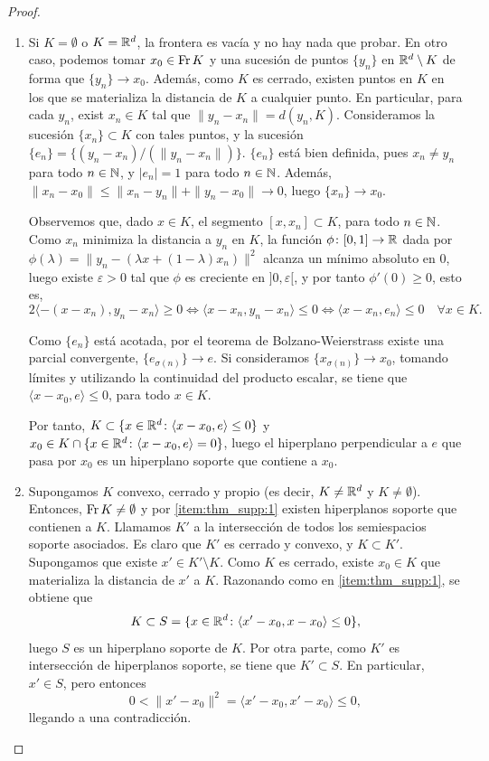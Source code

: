\begin{proof}~
    \begin{enumerate}
        \item Si $K = \emptyset$ o $K = \mathbb{R}^d$, la frontera es vacía y no hay nada que probar. En otro caso, podemos tomar $x_0 \in \operatorname{Fr} K$ y una sucesión de puntos $\{y_n\}$ en $\mathbb{R}^d \setminus K$ de forma que $\{y_n\} \to x_0$. Además, como $K$ es cerrado, existen puntos en $K$ en los que se materializa la distancia de $K$ a cualquier punto. En particular, para cada $y_n$, exist $x_n \in K$ tal que $\|y_n - x_n\| = d(y_n,K)$. Consideramos la sucesión $\{x_n\} \subset K$ con tales puntos, y la sucesión $\{e_n\} = \{(y_n-x_n)/(\|y_n - x_n\|) \}$. $\{e_n\}$ está bien definida, pues $x_n \ne y_n$ para todo $n \in \mathbb{N}$, y $|e_n| = 1$ para todo $n \in \mathbb{N}$. Además, $\|x_n - x_0\| \le \|x_n - y_n\| + \|y_n - x_0\| \to 0$, luego $\{x_n\} \to x_0$.

        Observemos que, dado $x \in K$, el segmento $[x,x_n] \subset K$, para todo $n \in \mathbb{N}$. Como $x_n$ minimiza la distancia a $y_n$ en $K$, la función $\phi\colon [0,1] \to \mathbb{R}$ dada por $\phi(\lambda) = \|y_n - (\lambda x + (1-\lambda)x_n)\|^2$ alcanza un mínimo absoluto en 0, luego existe $\varepsilon > 0$ tal que $\phi$ es creciente en $]0,\varepsilon[$, y por tanto $\phi'(0) \ge 0$, esto es, 
        \[2\langle -(x-x_n),y_n-x_n \rangle \ge 0 \iff \langle x - x_n, y_n - x_n \rangle \le 0 \iff \langle x - x_n, e_n \rangle \le 0 \quad \forall x \in K. \]

        Como $\{e_n\}$ está acotada, por el teorema de Bolzano-Weierstrass existe una parcial convergente, $\{e_{\sigma(n)}\} \to e$. Si consideramos $\{x_{\sigma(n)}\} \to x_0$, tomando límites y utilizando la continuidad del producto escalar, se tiene que $\langle x - x_0, e \rangle \le 0$, para todo $x \in K$.

        Por tanto, $K \subset \{x\in\mathbb{R}^d \colon \langle x - x_0, e \rangle \le 0 \}$ y $x_0 \in K \cap \{x \in \mathbb{R}^d \colon \langle x - x_0, e \rangle = 0\}$, luego el hiperplano perpendicular a $e$ que pasa por $x_0$ es un hiperplano soporte que contiene a $x_0$.

        \item Supongamos $K$ convexo, cerrado y propio (es decir, $K \ne \mathbb{R}^d$ y $K \ne \emptyset$). Entonces, $\operatorname{Fr} K \ne \emptyset$ y por \ref{item:thm_supp:1} existen hiperplanos soporte que contienen a $K$. Llamamos $K'$ a la intersección de todos los semiespacios soporte asociados. Es claro que $K'$ es cerrado y convexo, y $K \subset K'$. Supongamos que existe $x' \in K' \setminus K$. Como $K$ es cerrado, existe $x_0 \in K$ que materializa la distancia de $x'$ a $K$. Razonando como en \ref{item:thm_supp:1}, se obtiene que
        \[ K \subset S = \{x \in \mathbb{R}^d \colon \langle x' - x_0, x - x_0 \rangle \le 0 \}, \]
        luego $S$ es un hiperplano soporte de $K$. Por otra parte, como $K'$ es intersección de hiperplanos soporte, se tiene que $K' \subset S$. En particular, $x' \in S$, pero entonces
        \[ 0 < \|x' - x_0\|^2 = \langle x' - x_0, x' - x_0 \rangle \le 0, \]
        llegando a una contradicción.


\end{enumerate}
\end{proof}
